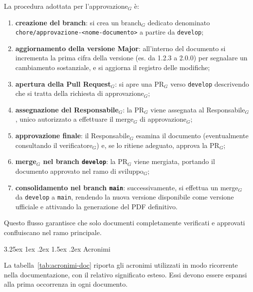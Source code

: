 \documentclass[a4paper, 10pt]{article}
\makeatletter
\renewcommand\paragraph{\@startsection{paragraph}{4}{\z@}%
  {3.25ex \@plus1ex \@minus .2ex}%
  {1.5ex \@plus .2ex}%
  {\normalfont\normalsize\bfseries}}
\makeatother
\begin{document}
La procedura adottata per l'approvazione$_G$ è:
\begin{enumerate}
    \item \textbf{creazione del branch}: si crea un branch$_G$ dedicato denominato \texttt{chore/approvazione-<nome-documento>} a partire da \texttt{develop};
    \item \textbf{aggiornamento della versione Major}: all'interno del documento si incrementa la prima cifra della versione (es. da 1.2.3 a 2.0.0) per segnalare un cambiamento sostanziale, e si aggiorna il registro delle modifiche;
    \item \textbf{apertura della Pull Request$_G$}: si apre una PR$_G$ verso \texttt{develop} descrivendo che si tratta della richiesta di approvazione$_G$;
    \item \textbf{assegnazione del Responsabile$_G$}: la PR$_G$ viene assegnata al Responsabile$_G$, unico autorizzato a effettuare il merge$_G$ di approvazione$_G$;
    \item \textbf{approvazione finale}: il Responsabile$_G$ esamina il documento (eventualmente consultando il verificatore$_G$) e, se lo ritiene adeguato, approva la PR$_G$;
    \item \textbf{merge$_G$ nel branch \texttt{develop}}: la PR$_G$ viene mergiata, portando il documento approvato nel ramo di sviluppo$_G$;
    \item \textbf{consolidamento nel branch \texttt{main}}: successivamente, si effettua un merge$_G$ da \texttt{develop} a \texttt{main}, rendendo la nuova versione disponibile come versione ufficiale e attivando la generazione del PDF definitivo.
\end{enumerate}
Questo flusso garantisce che solo documenti completamente verificati e approvati confluiscano nel ramo principale.

\paragraph{Acronimi}

La tabella~\ref{tab:acronimi-doc} riporta gli acronimi utilizzati in modo ricorrente nella documentazione, con il relativo significato esteso. Essi devono essere espansi alla prima occorrenza in ogni documento.
\end{document}
